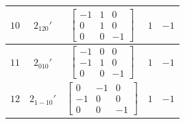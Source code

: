 \documentclass[fleqn,8pt]{jsarticle}
\begin{document}
\begin{longtable}{ccccc}
$ 10 $ & $ 2{}_{120}{}' $ & $ \begin{bmatrix} -1 & 1 & 0 \\ 0 & 1 & 0 \\ 0 & 0 & -1 \end{bmatrix} $ & $ 1 $ & $ -1 $ \\ \hline
$ 11 $ & $ 2{}_{010}{}' $ & $ \begin{bmatrix} -1 & 0 & 0 \\ -1 & 1 & 0 \\ 0 & 0 & -1 \end{bmatrix} $ & $ 1 $ & $ -1 $ \\ \hline
$ 12 $ & $ 2{}_{1-10}{}' $ & $ \begin{bmatrix} 0 & -1 & 0 \\ -1 & 0 & 0 \\ 0 & 0 & -1 \end{bmatrix} $ & $ 1 $ & $ -1 $ \\
\end{longtable}
\end{document}
